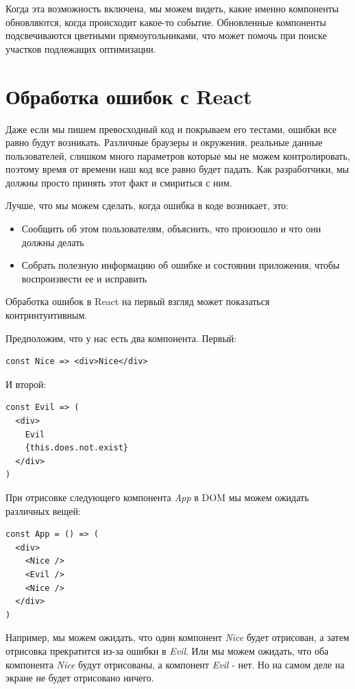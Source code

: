 Когда эта возможность включена, мы можем видеть, какие именно компоненты обновляются, когда происходит какое-то событие. Обновленные компоненты подсвечиваются цветными прямоугольниками, что может помочь при поиске участков подлежащих оптимизации.

\section{Обработка ошибок с React}

Даже если мы пишем превосходный код и покрываем его тестами, ошибки все равно будут возникать. Различные браузеры и окружения, реальные данные пользователей, слишком много параметров которые мы не можем контролировать, поэтому время от времени наш код все равно будет падать. Как разработчики, мы должны просто принять этот факт и смириться с ним.

Лучше, что мы можем сделать, когда ошибка в коде возникает, это:

\begin{itemize}
  \item Сообщить об этом пользователям, объяснить, что произошло и что они должны делать
  \item Собрать полезную информацию об ошибке и состоянии приложения, чтобы воспроизвести ее и исправить
\end{itemize}

Обработка ошибок в React на первый взгляд может показаться контринтуитивным.

Предположим, что у нас есть два компонента. Первый:

\begin{lstlisting}
const Nice => <div>Nice</div>
\end{lstlisting}

И второй:

\begin{lstlisting}
const Evil => (
  <div>
    Evil
    {this.does.not.exist}
  </div>
)
\end{lstlisting}

При отрисовке следующего компонента \textit{App} в DOM мы можем ожидать различных вещей:

\begin{lstlisting}
const App = () => (
  <div>
    <Nice />
    <Evil />
    <Nice />
  </div>
)
\end{lstlisting}

Например, мы можем ожидать, что один компонент \textit{Nice} будет отрисован, а затем отрисовка прекратится из-за ошибки в \textit{Evil}. Или мы можем ожидать, что оба компонента \textit{Nice} будут отрисованы, а компонент \textit{Evil} - нет. Но на самом деле на экране не будет отрисовано ничего.

